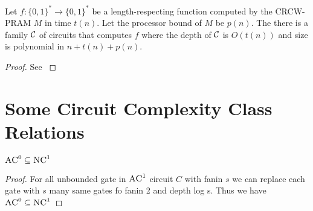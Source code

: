 \begin{theorem}\label{volthm2.56}
Let $f:\{0,1\}^*\to \{0,1\}^*$ be a length-respecting function computed by the  \textsc{CRCW-PRAM} $M$ in time $t(n)$. Let the processor bound of $M$ be $p(n)$. The there is a family $\mathcal{C}$ of circuits that computes $f$ where the depth of $\mathcal{C}$ is $O(t(n))$ and size is polynomial in $n+t(n)+p(n)$.
\end{theorem}
\begin{proof}
See \cite[Theorem 2.56, Page  70]{VollmerCh2}
\end{proof}

\section{Some Circuit Complexity Class Relations}
\begin{theorem}
	$\textsc{AC}^0\subseteq \textsc{NC}^1$
\end{theorem}
\begin{proof}
	For all unbounded gate in $\textsc{AC}^1$ circuit $C$ with fanin $s$ we can replace each gate with $s$ many same gates fo fanin 2 and depth log s. Thus we have $\textsc{AC}^0\subseteq \textsc{NC}^1$
\end{proof}

